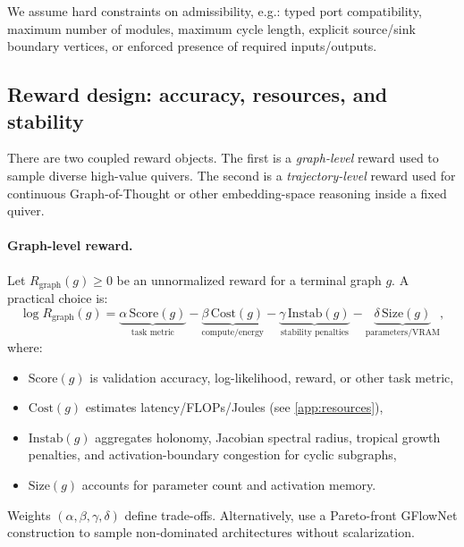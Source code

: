 \documentclass[11pt]{article}
\theoremstyle{definition}
\theoremstyle{plain}
\theoremstyle{remark}
\begin{document}
We assume hard constraints on admissibility, e.g.:
typed port compatibility, maximum number of modules, maximum cycle length, explicit source/sink boundary vertices, or enforced presence of required inputs/outputs.

\subsection{Reward design: accuracy, resources, and stability}
\label{sec:reward}

There are two coupled reward objects.
The first is a \emph{graph-level} reward used to sample diverse high-value quivers.
The second is a \emph{trajectory-level} reward used for continuous Graph-of-Thought or other embedding-space reasoning inside a fixed quiver.

\paragraph{Graph-level reward.}
Let $R_{\mathrm{graph}}(g)\ge 0$ be an unnormalized reward for a terminal graph $g$.
A practical choice is:
\[
\log R_{\mathrm{graph}}(g) =
\underbrace{\alpha\, \mathrm{Score}(g)}_{\text{task metric}}
-\underbrace{\beta\,\mathrm{Cost}(g)}_{\text{compute/energy}}
-\underbrace{\gamma\,\mathrm{Instab}(g)}_{\text{stability penalties}}
-\underbrace{\delta\,\mathrm{Size}(g)}_{\text{parameters/VRAM}},
\]
where:
\begin{itemize}[leftmargin=2em]
\item $\mathrm{Score}(g)$ is validation accuracy, log-likelihood, reward, or other task metric,
\item $\mathrm{Cost}(g)$ estimates latency/FLOPs/Joules (see \cref{app:resources}),
\item $\mathrm{Instab}(g)$ aggregates holonomy, Jacobian spectral radius, tropical growth penalties, and activation-boundary congestion for cyclic subgraphs,
\item $\mathrm{Size}(g)$ accounts for parameter count and activation memory.
\end{itemize}
Weights $(\alpha,\beta,\gamma,\delta)$ define trade-offs.
Alternatively, use a Pareto-front GFlowNet construction to sample non-dominated architectures without scalarization.
\end{document}
